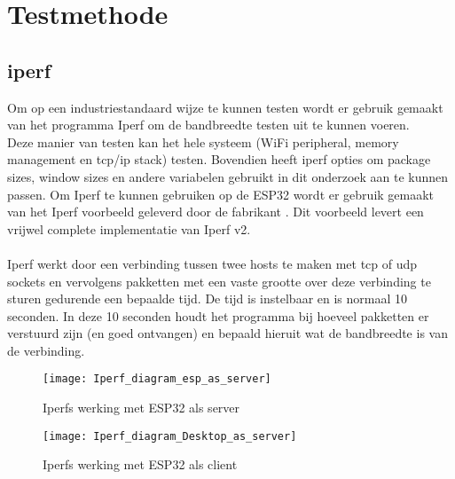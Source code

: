 \documentclass[../DCM2_Verslag.tex]{subfiles}
\begin{document}
\section{Testmethode}
\subsection{iperf}
Om op een industriestandaard wijze te kunnen testen wordt er gebruik gemaakt van het programma Iperf om de bandbreedte testen uit te kunnen voeren.\\
Deze manier van testen kan het hele systeem (WiFi peripheral, memory management en tcp/ip stack) testen. Bovendien heeft iperf opties om package sizes, window sizes en andere variabelen gebruikt in dit onderzoek aan te kunnen passen. Om Iperf te kunnen gebruiken op de ESP32 wordt er gebruik gemaakt van het Iperf voorbeeld geleverd door de fabrikant  \parencite{espiperfexample}. Dit voorbeeld levert een vrijwel complete implementatie van Iperf v2.\\\\
Iperf werkt door een verbinding tussen twee hosts te maken met tcp of udp sockets en vervolgens pakketten met een vaste grootte over deze verbinding te sturen gedurende een bepaalde tijd. De tijd is instelbaar en is normaal 10 seconden. In deze 10 seconden houdt het programma bij hoeveel pakketten er verstuurd zijn (en goed ontvangen) en bepaald hieruit wat de bandbreedte is van de verbinding.\\
\begin{figure}[h]
\texttt{[image: Iperf\_diagram\_esp\_as\_server]}
\caption{Iperfs werking met ESP32 als server}
\end{figure}
\begin{figure}[h]
\texttt{[image: Iperf\_diagram\_Desktop\_as\_server]}
\caption{Iperfs werking met ESP32 als client}
\end{figure}
\end{document}
